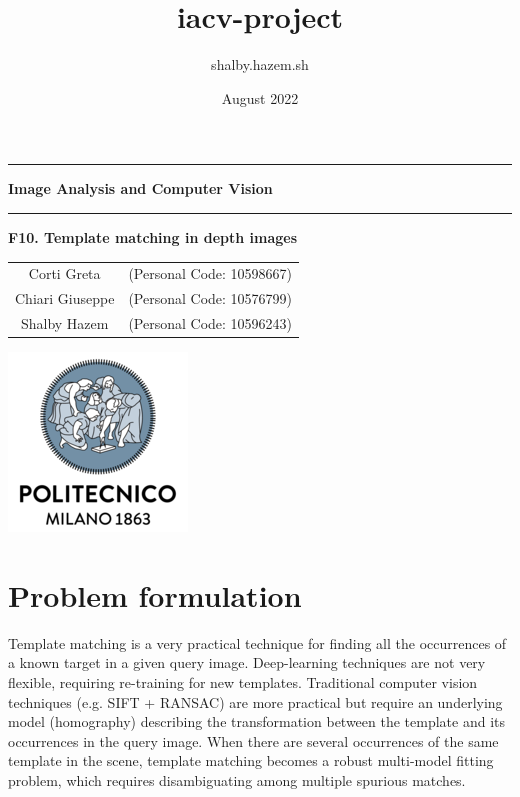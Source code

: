 \documentclass{article}
\title{iacv-project}
\author{shalby.hazem.sh }
\date{August 2022}
\begin{document}
\begin{titlepage}
	\centering
	\hrule
	\vspace{0,5cm}
	\Huge \textbf{Image Analysis and Computer Vision}
	\vspace{0,5cm}
	\hrule
	\vspace{2,0cm}
	{\Huge \textbf{F10. Template matching in depth images\\}}
		\vspace{0,5cm}
		\vspace{2,5cm}
		{
			\large
			\begin{tabular}{c c}
				Corti Greta & (Personal Code: 10598667)\\
                Chiari Giuseppe & (Personal Code: 10576799) \\
				Shalby Hazem & (Personal Code: 10596243) \\
			\end{tabular}
			
		}
		\vspace{2cm}
		\vspace{0,5cm}
		
		\centering\hspace{0,2cm}\includegraphics[scale=0.6]{./image/logo.png}
		\vspace{1,5cm}
		
		
		\end{titlepage}


\section{Problem formulation}
Template matching is a very practical technique for finding all the occurrences of a known target in a given query image. Deep-learning techniques are not very flexible, requiring re-training for new templates. Traditional computer vision techniques (e.g. SIFT + RANSAC) are more practical but require an underlying model (homography) describing the transformation between the template and its occurrences in the query image. When there are several occurrences of the same template in the scene, template matching becomes a robust multi-model fitting problem, which requires disambiguating among multiple spurious matches.
\end{document}
